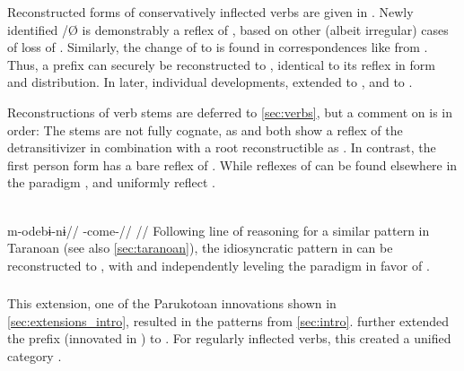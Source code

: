 Reconstructed \PPek forms of conservatively inflected verbs are given in .
Newly identified \ikpeng {}/Ø is demonstrably a reflex of \PXin {}, based on other (albeit irregular) cases of loss of  .
Similarly, the change of  to \bakairi {} is found in correspondences like  \parencite{meira2005southern} from \PC {}  \parencite[4]{gildea2007greenberg}.
Thus, a  prefix  can securely be reconstructed to \PPek, identical to its \arara reflex in form and distribution.
In later, individual developments, \bakairi extended  to , and \ikpeng to .



Reconstructions of verb stems are deferred to \cref{sec:verbs}, but a comment on  is in order:
The stems are not fully cognate, as \ikpeng and \bakairi both show a reflex of the \PPek detransitivizer  in combination with a root reconstructible as  .
In contrast, the \arara first person form has a bare reflex of .
While reflexes of  can be found elsewhere in the \arara paradigm , \ikpeng and \bakairi uniformly reflect .

\arara \parencite[][150]{alves2017arara}\\
\begingl
\gla m-odebɨ-nɨ//
\glb {}-come-//
\glft {}//
\endgl
\xe
%
Following  line of reasoning for a similar pattern in Taranoan (see also \cref{sec:taranoan}), the idiosyncratic pattern in \arara can be reconstructed to \PPek, with \bakairi and \ikpeng independently leveling the paradigm in favor of .

\subsubsection{\PWai {}}
\label{sec:waiwaian}
This extension, one of the Parukotoan innovations shown in \cref{sec:extensions_intro}, resulted in the \hixka patterns from \cref{sec:intro}.
\PWai further extended the  prefix  (innovated in \PPar) to .
For regularly inflected verbs, this created a unified  category .


